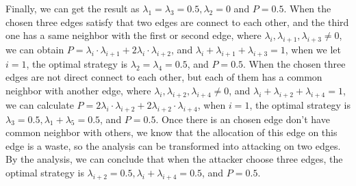 \documentclass[10pt,journal,compsoc]{IEEEtran}
\begin{document}
\begin{enumerate}
Finally, we can get the result as $\lambda_{1} = \lambda_{3}=0.5,\lambda_{2}=0$ and $P = 0.5$. When the chosen three edges satisfy that two edges are connect to each other, and the third one has a same neighbor with the first or second edge, where $\lambda_{i},\lambda_{i+1},\lambda_{i+3}\neq0$, we can obtain $P = \lambda_{i}\cdot\lambda_{i+1}+2\lambda_{i}\cdot\lambda_{i+2}$, and $\lambda_{i}+\lambda_{i+1}+\lambda_{i+3}=1$, when we let $i=1$, the optimal strategy is $\lambda_{2}=\lambda_{4}=0.5$, and $P=0.5$. When the chosen three edges are not direct connect to each other, but each of them has a common neighbor with another edge, where $\lambda_{i},\lambda_{i+2},\lambda_{i+4}\neq0$, and $\lambda_{i}+\lambda_{i+2}+\lambda_{i+4}=1$, we can calculate $P = 2\lambda_{i}\cdot\lambda_{i+2}+2\lambda_{i+2}\cdot\lambda_{i+4}$, when $i=1$, the optimal strategy is $\lambda_{3}=0.5,\lambda_{1}+\lambda_{5}=0.5$, and $P=0.5$. Once there is an chosen edge don't have common neighbor with others, we know that the allocation of this edge on this edge is a waste, so the analysis can be transformed into attacking on two edges. By the analysis, we can conclude that when the attacker choose three edges, the optimal strategy is $\lambda_{i+2}=0.5,\lambda_{i}+\lambda_{i+4}=0.5$, and $P=0.5$.
\end{enumerate}
\end{document}
